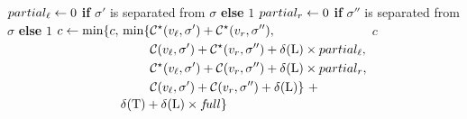 \begin{algorithm}[htb!]
\begin{algorithmic}
                        \State \(partial_\mathit{\ell} \gets 0\) \textbf{if} \(\sigma'\) is separated from \(\sigma\) \textbf{else} \(1\)
                        \State \(partial_r \gets 0\) \textbf{if} \(\sigma''\) is separated from \(\sigma\) \textbf{else} \(1\)
                        \State \(c \gets \min\{c, \begin{aligned}[t]
                            &\min\{
                            \begin{aligned}[t]
                                &\mathcal{C^\star}(v_\mathit{\ell}, \sigma') + \mathcal{C^\star}(v_r, \sigma''),\\
                                &\mathcal{C}(v_\mathit{\ell}, \sigma') + \mathcal{C^\star}(v_r, \sigma'') +
                                    \delta\kern.1pt(\mathrm{L}) \times partial_\mathit{\ell},\\
                                &\mathcal{C^\star}(v_\mathit{\ell}, \sigma') + \mathcal{C}(v_r, \sigma'') +
                                    \delta\kern.1pt(\mathrm{L}) \times partial_r,\\
                                &\mathcal{C}(v_\mathit{\ell}, \sigma') + \mathcal{C}(v_r, \sigma'') + \delta\kern.1pt(\mathrm{L})
                                \}\ +
                            \end{aligned}\\[-.25em]
                            &\delta\kern.1pt(\mathrm{T}) + \delta\kern.1pt(\mathrm{L}) \times f\!ull\}
                        \end{aligned}\)
                    \EndIf
                \EndFor
                \State \Return \(c\)
            \EndIf
        \EndFunction
    \end{algorithmic}
    \caption{Computing the value of \(\dt{C^\star}{v, \sigma}\)}
    \label{alg:superdtl:cstarmin-rec}
\end{algorithm}

